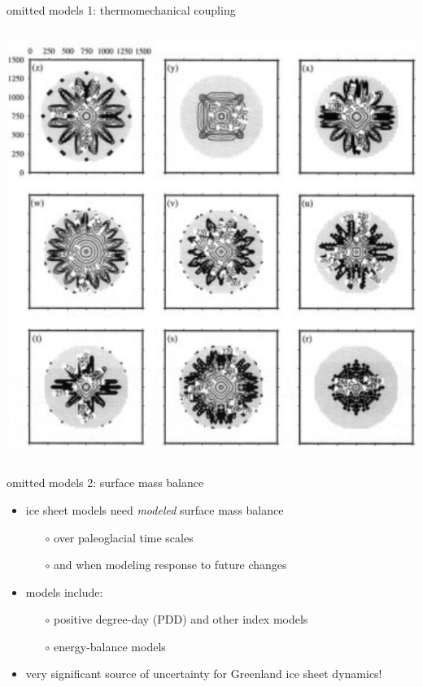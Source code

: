 \begin{frame}{omitted models 1: thermomechanical coupling}
\begin{columns}
\begin{column}{0.4\textwidth}
\bigskip
  \includegraphics[width=1.0\textwidth]{photos/eisIIF}
\end{column}
\end{columns}
\end{frame}


\begin{frame}{omitted models 2: surface mass balance}

\begin{itemize}
\item ice sheet models need \emph{modeled} surface mass balance
  \begin{itemize}
  \item[$\circ$] over paleoglacial time scales
  \item[$\circ$] and when modeling response to future changes
  \end{itemize}
\item models include:
  \begin{itemize}
  \item[$\circ$] positive degree-day (PDD) and other index models
  \item[$\circ$] energy-balance models
  \end{itemize}
\nocite{Hock05}
\item very significant source of uncertainty for Greenland ice sheet dynamics!
\end{itemize}
\end{frame}


